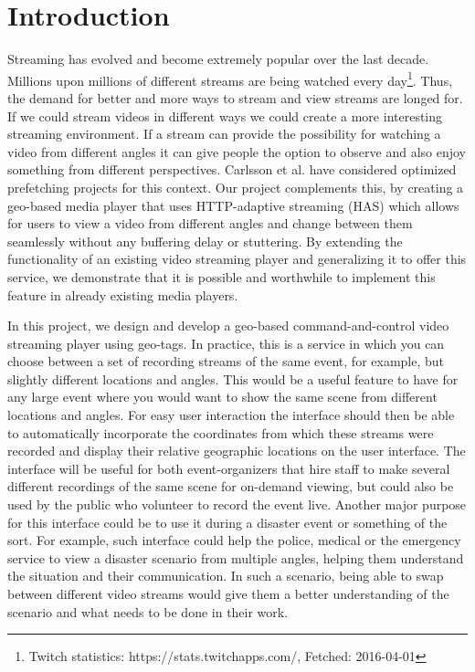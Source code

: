 \chapter{Introduction}
\label{cha:introduction}

Streaming has evolved and become extremely popular over the last decade. Millions upon millions of different streams are being watched every day\footnote{Twitch statistics: https://stats.twitchapps.com/, Fetched: 2016-04-01}. Thus, the demand for better and more ways to stream and view streams are longed for. If we could stream videos in different ways we could create a more interesting streaming environment. If a stream can provide the possibility for watching a video from different angles it can give people the option to observe and also enjoy something from different perspectives. Carlsson et al. \cite{optimizedstreaming} have considered optimized prefetching projects for this context. Our project complements this, by creating a geo-based media player that uses HTTP-adaptive streaming (HAS) which allows for users to view a video from different angles and change between them seamlessly without any buffering delay or stuttering. By extending the functionality of an existing video streaming player and generalizing it to offer this service, we demonstrate that it is possible and worthwhile to implement this feature in already existing media players.

In this project, we design and develop a geo-based command-and-control video streaming player using geo-tags. In practice, this is a service in which you can choose between a set of recording streams of the same event, for example, but slightly different locations and angles. This would be a useful feature to have for any large event where you would want to show the same scene from different locations and angles. For easy user interaction the interface should then be able to automatically incorporate the coordinates from which these streams were recorded and display their relative geographic locations on the user interface. The interface will be useful for both event-organizers that hire staff to make several different recordings of the same scene for on-demand viewing, but could also be used by the public who volunteer to record the event live. Another major purpose for this interface could be to use it during a disaster event or something of the sort. For example, such interface could help the police, medical or the emergency service to view a disaster scenario from multiple angles, helping them understand the situation and their communication. In such a scenario, being able to swap between different video streams would give them a better understanding of the scenario and what needs to be done in their work.

